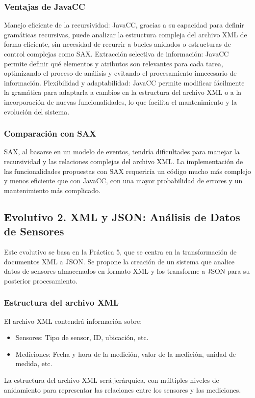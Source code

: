 \subsubsection{Ventajas de JavaCC}

Manejo eficiente de la recursividad: JavaCC, gracias a su capacidad para definir gramáticas recursivas, puede analizar la estructura compleja del archivo XML de forma eficiente, sin necesidad de recurrir a bucles anidados o estructuras de control complejas como SAX.
Extracción selectiva de información: JavaCC permite definir qué elementos y atributos son relevantes para cada tarea, optimizando el proceso de análisis y evitando el procesamiento innecesario de información.
Flexibilidad y adaptabilidad: JavaCC permite modificar fácilmente la gramática para adaptarla a cambios en la estructura del archivo XML o a la incorporación de nuevas funcionalidades, lo que facilita el mantenimiento y la evolución del sistema.

\subsubsection{Comparación con SAX}

SAX, al basarse en un modelo de eventos, tendría dificultades para manejar la recursividad y las relaciones complejas del archivo XML. La implementación de las funcionalidades propuestas con SAX requeriría un código mucho más complejo y menos eficiente que con JavaCC, con una mayor probabilidad de errores y un mantenimiento más complicado.

\subsection{Evolutivo 2. XML y JSON: Análisis de Datos de Sensores}

Este evolutivo se basa en la Práctica 5, que se centra en la transformación de documentos XML a JSON. Se propone la creación de un sistema que analice datos de sensores almacenados en formato XML y los transforme a JSON para su posterior procesamiento.

\subsubsection*{Estructura del archivo XML}

El archivo XML contendrá información sobre:

\begin{itemize}
  \item Sensores: Tipo de sensor, ID, ubicación, etc.
  \item Mediciones: Fecha y hora de la medición, valor de la medición, unidad de medida, etc.
\end{itemize}
La estructura del archivo XML será jerárquica, con múltiples niveles de anidamiento para representar las relaciones entre los sensores y las mediciones.

